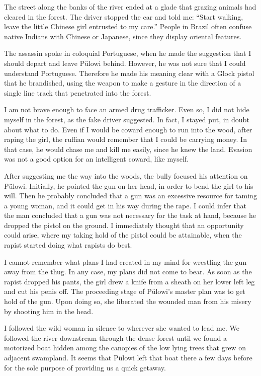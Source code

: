 \documentclass[
  12pt,
]{book}
\begin{document}
The street along the banks of the river ended at a glade that grazing
animals had cleared in the forest. The driver stopped the car and told
me: ``Start walking, leave the little Chinese girl entrusted to my
care.'' People in Brazil often confuse native Indians with Chinese or
Japanese, since they display oriental features.

The assassin spoke in coloquial Portuguese, when he made the suggestion
that I should depart and leave Pülowi behind. However, he was not sure
that I could understand Portuguese. Therefore he made his meaning clear
with a Glock pistol that he brandished, using the weapon to make a
gesture in the direction of a single line track that penetrated into the
forest.

I am not brave enough to face an armed drug trafficker. Even so, I did
not hide myself in the forest, as the fake driver suggested. In fact, I
stayed put, in doubt about what to do. Even if I would be coward enough
to run into the wood, after raping the girl, the ruffian would remember
that I could be carrying money. In that case, he would chase me and kill
me easily, since he knew the land. Evasion was not a good option for an
intelligent coward, like myself.

After suggesting me the way into the woods, the bully focused his
attention on Pülowi. Initially, he pointed the gun on her head, in order
to bend the girl to his will. Then he probably concluded that a gun was
an excessive resource for taming a young woman, and it could get in his
way during the rape. I could infer that the man concluded that a gun was
not necessary for the task at hand, because he dropped the pistol on the
ground. I immediately thought that an opportunity could arise, where my
taking hold of the pistol could be attainable, when the rapist started
doing what rapists do best.

I cannot remember what plans I had created in my mind for wrestling the
gun away from the thug. In any case, my plans did not come to bear. As
soon as the rapist dropped his pants, the girl drew a knife from a
sheath on her lower left leg and cut his penis off. The proceeding stage
of Pülowi's master plan was to get hold of the gun. Upon doing so, she
liberated the wounded man from his misery by shooting him in the head.

I followed the wild woman in silence to wherever she wanted to lead me.
We followed the river downstream through the dense forest until we found
a motorized boat hidden among the canopies of the low lying trees that
grew on adjacent swampland. It seems that Pülowi left that boat there a
few days before for the sole purpose of providing us a quick getaway.
\end{document}
